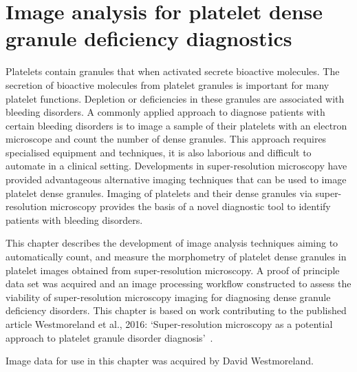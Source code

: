 \chapter{Image analysis for platelet dense granule deficiency diagnostics}
\label{platelets}
\ifpdf
    \graphicspath{{chapter_3/figs/}}
\fi


Platelets contain granules that when activated secrete bioactive molecules. The secretion of bioactive molecules from platelet granules is important for many platelet functions. Depletion or deficiencies in these granules are associated with bleeding disorders. A commonly applied approach to diagnose patients with certain bleeding disorders is to image a sample of their platelets with an electron microscope and count the number of dense granules. This approach requires specialised equipment and techniques, it is also laborious and difficult to automate in a clinical setting. Developments in super-resolution microscopy have provided advantageous alternative imaging techniques that can be used to image platelet dense granules. Imaging of platelets and their dense granules via super-resolution microscopy provides the basis of a novel diagnostic tool to identify patients with bleeding disorders.

This chapter describes the development of image analysis techniques aiming to automatically count, and measure the morphometry of platelet dense granules in platelet images obtained from super-resolution microscopy. A proof of principle data set was acquired and an image processing workflow constructed to assess the viability of super-resolution microscopy imaging for diagnosing dense granule deficiency disorders. This chapter is based on work contributing to the published article Westmoreland et al., 2016: `Super-resolution microscopy as a potential approach to platelet granule disorder diagnosis'~\cite{Westmoreland2016}.

Image data for use in this chapter was acquired by David Westmoreland.



